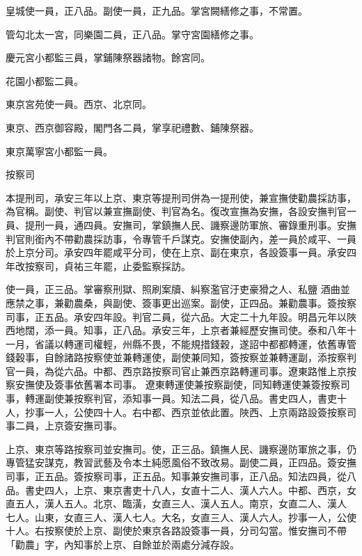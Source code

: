 \begin{pinyinscope}
 皇城使一員，正八品。副使一員，正九品。掌宮闕繕修之事，不常置。



 管勾北太一宮，同樂園二員，正八品。掌守宮園繕修之事。



 慶元宮小都監三員，掌鋪陳祭器諸物。餘宮同。



 花園小都監二員。



 東京宮苑使一員。西京、北京同。



 東京、西京御容殿，閣門各二員，掌享祀禮數、鋪陳祭器。



 東京萬寧宮小都監一員。



 按察司



 本提刑司，承安三年以上京、東京等提刑司併為一提刑使，兼宣撫使勸農採訪事，為官稱。副使、判官以兼宣撫副使、判官為名。復改宣撫為安撫，各設安撫判官一員、提刑一員，通四員。安撫司，掌鎮撫人民、譏察邊防軍旅、審錄重刑事。安撫判官則銜內不帶勸農採訪事，令專管千戶謀克。安撫使副內，差一員於咸平、一員於上京分司。承安四年罷咸平分司，使在上京、副在東京，各設簽事一員。承安四年改按察司，貞祐三年罷，止委監察採訪。



 使一員，正三品。掌審察刑獄、照刷案牘、糾察濫官汙吏豪猾之人、私鹽
 酒曲並應禁之事，兼勸農桑，與副使、簽事更出巡案。副使，正四品。兼勸農事。簽按察司事，正五品。承安四年設。判官二員，從六品。大定二十九年設。明昌元年以陜西地闊，添一員。知事，正八品。承安三年，上京者兼經歷安撫司使。泰和八年十一月，省議以轉運司權輕，州縣不畏，不能規措錢穀，遂詔中都都轉運，依舊專管錢穀事，自餘諸路按察使並兼轉運使，副使兼同知，簽按察並兼轉運副，添按察判官一員，為從六品。中都、西京路按察司官止兼西京路轉運司事。遼東路惟上京按察安撫使及簽事依舊署本司事。
 遼東轉運使兼按察副使，同知轉運使兼簽按察司事，轉運副使兼按察判官，添知事一員。知法二員，從八品。書史四人，書吏十人，抄事一人，公使四十人。右中都、西京並依此置。陜西、上京兩路設簽按察司事二員，上京簽安撫司事。



 上京、東京等路按察司並安撫司。使，正三品。鎮撫人民、譏察邊防軍旅之事，仍專管猛安謀克，教習武藝及令本土純愿風俗不致改易。副使二員，正四品。簽安撫司事，正五品。簽按察司事，正五品。知事兼安撫司事，正八品。知法四員，從八品。書史四人，上京、東京書吏十八人，女直十二人、漢人六人。中都、西京，女直五人，漢人五人。北京、臨潢，女直三人、漢人五人。南京，女直二人、漢人
 七人。山東，女直三人、漢人七人。大名，女直三人、漢人六人。抄事一人，公使十人。右按察使於上京、副使於東京各路設簽事一員，分司勾當。惟安撫司不帶「勸農」字，內知事於上京、自餘並於兩處分減存設。




\end{pinyinscope}
